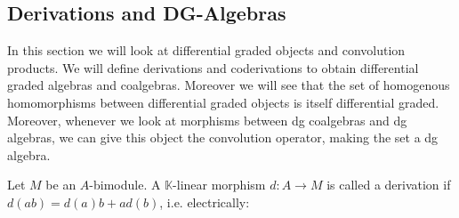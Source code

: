 \documentclass[../thesis.tex]{subfiles}
\begin{document}
    \subsection{Derivations and DG-Algebras}
            In this section we will look at differential graded objects and convolution products. We will define derivations and coderivations to obtain differential graded algebras and coalgebras. Moreover we will see that the set of homogenous homomorphisms between differential graded objects is itself differential graded. Moreover, whenever we look at morphisms between dg coalgebras and dg algebras, we can give this object the convolution operator, making the set a dg algebra.

            \begin{definition}
                Let $M$ be an $A$-bimodule. A $\mathbb{K}$-linear morphism $d:A\rightarrow M$ is called a derivation if $d(ab)=d(a)b+ad(b)$, i.e. electrically:

                \begin{center}
\end{center}
\end{definition}
\end{document}
